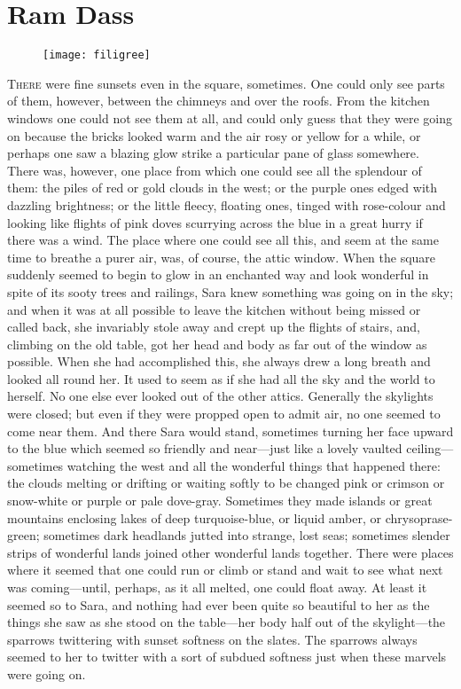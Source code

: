\chapter{Ram Dass}

\begin{figure}[t!]
\centering
\texttt{[image: filigree]}
\end{figure}

\lettrine[lines=5]{T}{here} were fine sunsets even in the square, sometimes. One could only see parts of them, however, between the chimneys and over the roofs. From the kitchen windows one could not see them at all, and could only guess that they were going on because the bricks looked warm and the air rosy or yellow for a while, or perhaps one saw a blazing glow strike a particular pane of glass somewhere. There was, however, one place from which one could see all the splendour of them: the piles of red or gold clouds in the west; or the purple ones edged with dazzling brightness; or the little fleecy, floating ones, tinged with rose-colour and looking like flights of pink doves scurrying across the blue in a great hurry if there was a wind. The place where one could see all this, and seem at the same time to breathe a purer air, was, of course, the attic window. When the square suddenly seemed to begin to glow in an enchanted way and look wonderful in spite of its sooty trees and railings, Sara knew something was going on in the sky; and when it was at all possible to leave the kitchen without being missed or called back, she invariably stole away and crept up the flights of stairs, and, climbing on the old table, got her head and body as far out of the window as possible. When she had accomplished this, she always drew a long breath and looked all round her. It used to seem as if she had all the sky and the world to herself. No one else ever looked out of the other attics. Generally the skylights were closed; but even if they were propped open to admit air, no one seemed to come near them. And there Sara would stand, sometimes turning her face upward to the blue which seemed so friendly and near—just like a lovely vaulted ceiling—sometimes watching the west and all the wonderful things that happened there: the clouds melting or drifting or waiting softly to be changed pink or crimson or snow-white or purple or pale dove-gray. Sometimes they made islands or great mountains enclosing lakes of deep turquoise-blue, or liquid amber, or chrysoprase-green; sometimes dark headlands jutted into strange, lost seas; sometimes slender strips of wonderful lands joined other wonderful lands together. There were places where it seemed that one could run or climb or stand and wait to see what next was coming—until, perhaps, as it all melted, one could float away. At least it seemed so to Sara, and nothing had ever been quite so beautiful to her as the things she saw as she stood on the table—her body half out of the skylight—the sparrows twittering with sunset softness on the slates. The sparrows always seemed to her to twitter with a sort of subdued softness just when these marvels were going on.

